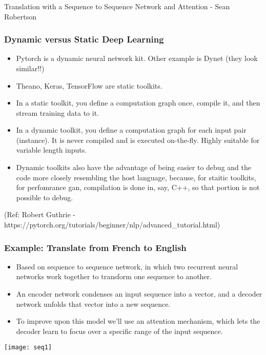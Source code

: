 \begin{frame}[fragile]\frametitle{}

\begin{center}
{\Large Translation with a Sequence to Sequence Network and Attention - Sean Robertson }


\end{center}
\end{frame}


\begin{frame}[fragile]
\frametitle{Dynamic versus Static Deep Learning}
\begin{itemize}
\item Pytorch is a dynamic neural network kit. Other example is Dynet (they look similar!!)
\item Theano, Keras, TensorFlow are static toolkits.
\item In a static toolkit, you define a computation graph once, compile it, and then stream training data to it.
\item In a dynamic toolkit, you define a computation graph for each input pair (instance). It is never compiled and is executed on-the-fly. Highly suitable for variable length inputs.
\item Dynamic toolkits also have the advantage of being easier to debug and the code more closely resembling the host language, because, for staitic toolkits, for perfomrance gan, compilation is done in, say, C++, so that portion is not possible to debug.
\end{itemize}
 
{ \tiny (Ref:  Robert Guthrie -  https://pytorch.org/tutorials/beginner/nlp/advanced\_tutorial.html)}
\end{frame} 

\begin{frame}[fragile]
\frametitle{ Example: Translate from French to English}
\begin{itemize}
\item Based on  sequence to sequence network, in which two recurrent neural networks work together to transform one sequence to another. 
\item An encoder network condenses an input sequence into a vector, and a decoder network unfolds that vector into a new sequence.
\item To improve upon this model we'll use an attention mechanism, which lets the decoder learn to focus over a specific range of the input sequence.
\end{itemize}
\begin{center}
\texttt{[image: seq1]}
\end{center}     
\end{frame} 

